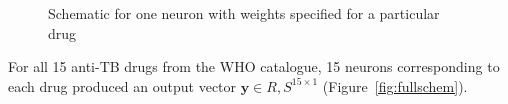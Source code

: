 \begin{figure}[htbp]
  \caption{Schematic for one neuron with weights specified for a particular drug}
  \label{fig:onescheme}
\end{figure}

For all 15 anti-TB drugs from the WHO catalogue, 15 neurons corresponding to each drug produced an output vector $\mathbf{y}\in {R,S}^{15\times1}$ (Figure~\ref{fig:fullschem}).

